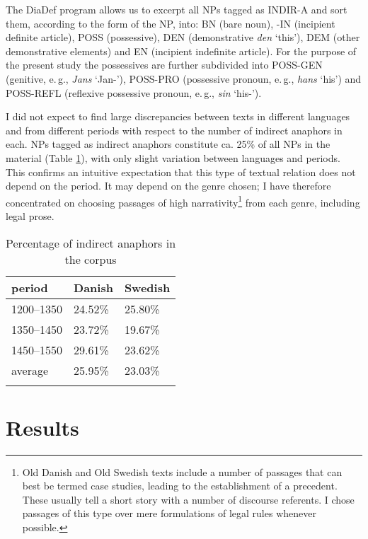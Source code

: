\documentclass[output=paper]{langsci/langscibook}
\begin{document}
The DiaDef program allows us to excerpt all NPs tagged as INDIR-A and sort them, according to the form of the NP, into: BN (bare noun), -IN (incipient definite article), POSS (possessive), DEN (demonstrative {\emph{den}} `this'), DEM (other demonstrative elements) and EN (incipient indefinite article). For the purpose of the present study the possessives are further subdivided into POSS-GEN (genitive, e.\,g., {\emph{Jans}} `Jan-{}'), POSS-PRO (possessive pronoun, e.\,g., {\emph{hans}} `his') and POSS-REFL (reflexive possessive pronoun, e.\,g., {\emph{sin}} `his-{}').

{
I did not expect to find large discrepancies between texts in different languages and from different periods with respect to the number of indirect anaphors in each. NPs tagged as indirect anaphors constitute ca. 25\% of all NPs in the material (Table \ref{6table:2}), with only slight variation between languages and periods. This confirms an intuitive expectation that this type of textual relation does not depend on the period. It may depend on the genre chosen; I have therefore concentrated on choosing passages of high narrativity\footnote{Old Danish and Old Swedish texts include a number of passages that can best be termed case studies, leading to the establishment of a precedent. These usually tell a short story with a number of discourse referents. I chose passages of this type over mere formulations of legal rules whenever possible.} from each genre, including legal prose. 
}

\begin{table}[H]
\begin{tabular}{m{70pt}m{70pt}m{70pt}}
\lsptoprule
{\textbf{period}} & {\textbf{Danish}} & {\textbf{Swedish}}\\ 
\midrule
1200--1350	& 24.52\%		& 25.80\% \\ 
1350--1450	& 23.72\%		& 19.67\% \\ 
1450--1550	& 29.61\%		& 23.62\% \\ 
average		& 25.95\%		& 23.03\% \\ 
\lspbottomrule
\end{tabular}
\caption{Percentage of indirect anaphors in the corpus}\label{6table:2}
\end{table}

\filbreak
\section{Results}\label{6sec:4}
\end{document}

